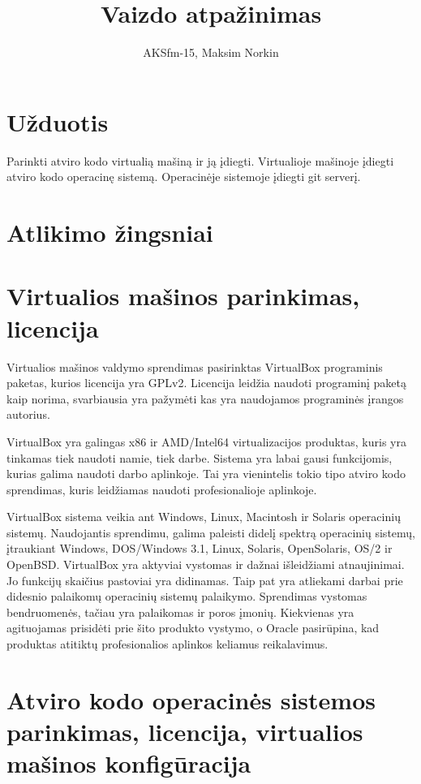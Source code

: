 \documentclass[11pt, a4paper, lithuanian]{article}
\author{AKSfm-15, Maksim Norkin}
\title{Vaizdo atpažinimas}
\begin{document}
    \maketitle

    \section{Užduotis}

    Parinkti atviro kodo virtualią mašiną ir ją įdiegti. Virtualioje mašinoje įdiegti atviro kodo operacinę sistemą. Operacinėje sistemoje įdiegti git serverį.

    \section{Atlikimo žingsniai}

    \section{Virtualios mašinos parinkimas, licencija}

    Virtualios mašinos valdymo sprendimas pasirinktas VirtualBox programinis paketas, kurios licencija yra GPLv2. 
    Licencija leidžia naudoti programinį paketą kaip norima, svarbiausia yra pažymėti kas yra naudojamos programinės įrangos autorius.

    VirtualBox yra galingas x86 ir AMD/Intel64 virtualizacijos produktas, kuris yra tinkamas tiek naudoti namie, tiek darbe. 
    Sistema yra labai gausi funkcijomis, kurias galima naudoti darbo aplinkoje. 
    Tai yra vienintelis tokio tipo atviro kodo sprendimas, kuris leidžiamas naudoti profesionalioje aplinkoje.

    VirtualBox sistema veikia ant Windows, Linux, Macintosh ir Solaris operacinių sistemų.
    Naudojantis sprendimu, galima paleisti didelį spektrą operacinių sistemų, įtraukiant Windows, DOS/Windows 3.1, Linux, Solaris, OpenSolaris, OS/2 ir OpenBSD.
    VirtualBox yra aktyviai vystomas ir dažnai išleidžiami atnaujinimai.
    Jo funkcijų skaičius pastoviai yra didinamas. Taip pat yra atliekami darbai prie didesnio palaikomų operacinių sistemų palaikymo.
    Sprendimas vystomas bendruomenės, tačiau yra palaikomas ir poros įmonių. 
    Kiekvienas yra agituojamas prisidėti prie šito produkto vystymo, o Oracle pasirūpina, kad produktas atitiktų profesionalios aplinkos keliamus reikalavimus.

    \section{Atviro kodo operacinės sistemos parinkimas, licencija, virtualios mašinos konfigūracija}
\end{document}
